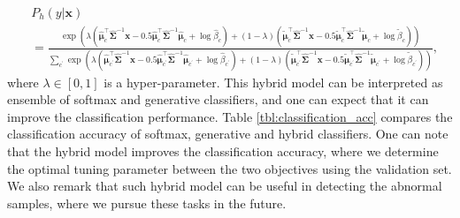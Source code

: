 \documentclass{article}
\begin{document}
\begin{align*}
    & P_{h}(y|\mathbf{x}) \\
    & = \frac{\exp \left( \lambda  \left( \mathbf{\widehat \mu}_c^\top \mathbf{ \widehat \Sigma}^{-1} \mathbf{x} -0.5 \mathbf{\widehat \mu}_c^\top \mathbf{\widehat \Sigma}^{-1} \mathbf{\widehat \mu}_c +\log {\widehat \beta}_c \right)
    + (1-\lambda)  \left( \mathbf{\tilde \mu}_c^\top \mathbf{ \widehat \Sigma}^{-1} \mathbf{x} -0.5 \mathbf{\tilde \mu}_c^\top \mathbf{\widehat \Sigma}^{-1} \mathbf{\tilde \mu}_c +\log {\tilde \beta}_c \right)\right)}{\sum_{c^\prime} \exp \left( \lambda  \left( \mathbf{\widehat \mu}_{c^\prime}^\top \mathbf{ \widehat \Sigma}^{-1} \mathbf{x} -0.5 \mathbf{\widehat \mu}_{c^\prime}^\top \mathbf{\widehat \Sigma}^{-1} \mathbf{\widehat \mu}_{c^\prime} +\log {\widehat \beta}_{c^\prime} \right)
    + (1-\lambda)  \left( \mathbf{\tilde \mu}_{c^\prime}^\top \mathbf{ \widehat \Sigma}^{-1} \mathbf{x} -0.5 \mathbf{\tilde \mu}_{c^\prime}^\top \mathbf{\widehat \Sigma}^{-1} \mathbf{\tilde \mu}_{c^\prime} +\log {\tilde \beta}_{c^\prime} \right)\right)},
\end{align*}
where $\lambda \in [0, 1]$ is a hyper-parameter. 
This hybrid model can be interpreted as ensemble of softmax and generative classifiers, and one can expect that it can improve the classification performance.
Table \ref{tbl:classification_acc} compares the classification accuracy of softmax, generative and hybrid classifiers.
One can note that the hybrid model improves the classification accuracy, where we determine the optimal tuning parameter between the two objectives using the validation set.
We also remark that such hybrid model can be useful in detecting the abnormal samples, where we pursue these tasks in the future.
\end{document}
